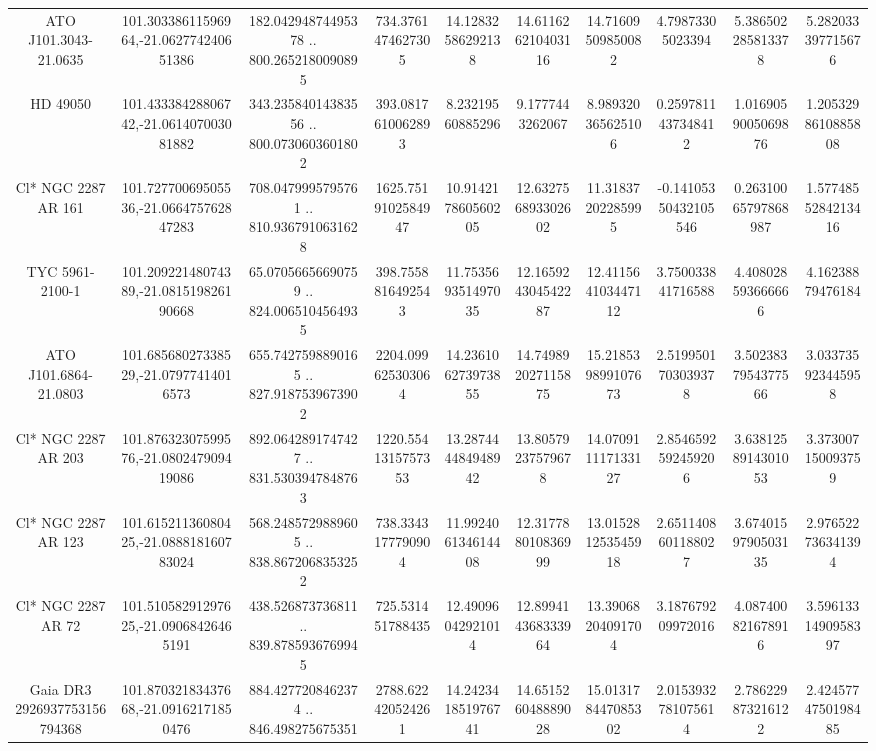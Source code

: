 \begin{table}
\begin{tabular}{cccccccccc}
ATO J101.3043-21.0635 & 101.30338611596964,-21.062774240651386 & 182.04294874495378 .. 800.2652180090895 & 734.3761474627305 & 14.12832586292138 & 14.611626210403116 & 14.71609509850082 & 4.79873305023394 & 5.386502285813378 & 5.282033397715676 \\
HD  49050 & 101.43338428806742,-21.061407003081882 & 343.23584014383556 .. 800.0730603601802 & 393.0817610062893 & 8.23219560885296 & 9.1777443262067 & 8.989320365625106 & 0.2597811437348412 & 1.0169059005069876 & 1.2053298610885808 \\
Cl* NGC 2287     AR     161 & 101.72770069505536,-21.066475762847283 & 708.0479995795761 .. 810.9367910631628 & 1625.7519102584947 & 10.914217860560205 & 12.632756893302602 & 11.31837202285995 & -0.14105350432105546 & 0.26310065797868987 & 1.5774855284213416 \\
TYC 5961-2100-1 & 101.20922148074389,-21.081519826190668 & 65.07056656690759 .. 824.0065104564935 & 398.7558816492543 & 11.753569351497035 & 12.165924304542287 & 12.411564103447112 & 3.750033841716588 & 4.408028593666666 & 4.16238879476184 \\
ATO J101.6864-21.0803 & 101.68568027338529,-21.07977414016573 & 655.7427598890165 .. 827.9187539673902 & 2204.099625303064 & 14.236106273973855 & 14.749892027115875 & 15.218539899107673 & 2.5199501703039378 & 3.5023837954377566 & 3.033735923445958 \\
Cl* NGC 2287     AR     203 & 101.87632307599576,-21.080247909419086 & 892.0642891747427 .. 831.5303947848763 & 1220.5541315757353 & 13.287444484948942 & 13.80579237579678 & 14.070911117133127 & 2.8546592592459206 & 3.6381258914301053 & 3.373007150093759 \\
Cl* NGC 2287     AR     123 & 101.61521136080425,-21.088818160783024 & 568.2485729889605 .. 838.8672068353252 & 738.3343177790904 & 11.992406134614408 & 12.317788010836999 & 13.015281253545918 & 2.6511408601188027 & 3.6740159790503135 & 2.976522736341394 \\
Cl* NGC 2287     AR      72 & 101.51058291297625,-21.09068426465191 & 438.526873736811 .. 839.8785936769945 & 725.531451788435 & 12.49096042921014 & 12.899414368333964 & 13.39068204091704 & 3.187679209972016 & 4.087400821678916 & 3.5961331490958397 \\
Gaia DR3 2926937753156794368 & 101.87032183437668,-21.09162171850476 & 884.4277208462374 .. 846.498275675351 & 2788.622420524261 & 14.242341851976741 & 14.651526048889028 & 15.013178447085302 & 2.0153932781075614 & 2.786229873216122 & 2.4245774750198485 \\

\end{tabular}
\end{table}

